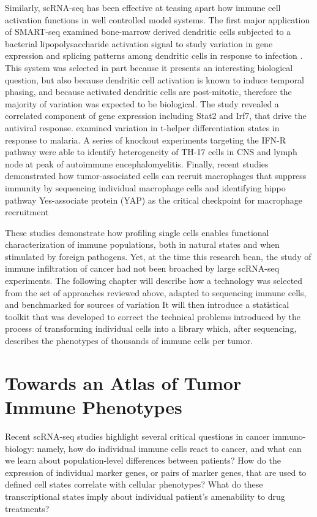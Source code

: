 Similarly, scRNA-seq has been effective at teasing apart how immune cell activation functions in well controlled model systems. 
The first major application of SMART-seq examined bone-marrow derived dendritic cells subjected to a bacterial lipopolysaccharide activation signal to study variation in gene expression and splicing patterns among dendritic cells in response to infection \citep{Shalek2013}.
This system was selected in part because it presents an interesting biological question, but also because dendritic cell activation is known to induce temporal phasing, and because activated dendritic cells are post-mitotic, therefore the majority of variation was expected to be biological. 
The study revealed a correlated component of gene expression including Stat2 and Irf7, that drive the antiviral response.
\cite{Loennberg2017} examined variation in t-helper differentiation states in response to malaria. 
A series of knockout experiments targeting the IFN-R pathway \citep{Gaublomme2015} were able to identify heterogeneity of TH-17 cells in CNS and lymph node at peak of autoimmune encephalomyelitis. 
Finally, recent studies demonstrated how tumor-associated cells can recruit macrophages that suppress immunity by sequencing individual macrophage cells and identifying hippo pathway Yes-associate protein (YAP) as the critical checkpoint for macrophage recruitment \citep{Guo2017}

These studies demonstrate how profiling single cells enables functional characterization of immune populations, both in natural states and when stimulated by foreign pathogens. 
Yet, at the time this research bean, the study of immune infiltration of cancer had not been broached by large scRNA-seq experiments. 
The following chapter will describe how a technology was selected from the set of approaches reviewed above, adapted to sequencing immune cells, and benchmarked for sources of variation
It will then introduce a statistical toolkit that was developed to correct the technical problems introduced by the process of transforming individual cells into a library which, after sequencing, describes the phenotypes of thousands of immune cells per tumor. 

\section{Towards an Atlas of Tumor Immune Phenotypes}

Recent scRNA-seq studies highlight several critical questions in cancer immuno-biology: namely, how do individual immune cells react to cancer, and what can we learn about population-level differences between patients? 
How do the expression of individual marker genes, or pairs of marker genes, that are used to defined cell states correlate with cellular phenotypes? 
What do these transcriptional states imply about individual patient's amenability to drug treatments?  

